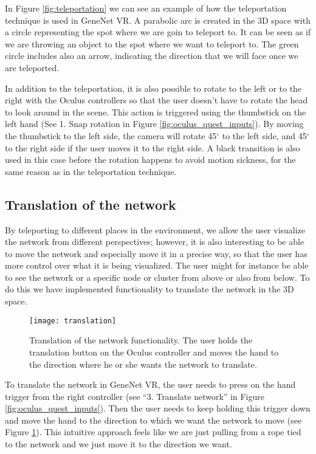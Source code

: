 In Figure \ref{fig:teleportation} we can see an example of how the teleportation technique is used in GeneNet VR. A  parabolic arc is created in the 3D space with a circle representing the spot where we are goin to teleport to. It can be seen as if we are throwing an object to the spot where we want to teleport to. The green circle includes also an arrow, indicating the direction that we will face once we are teleported.

In addition to the teleportation, it is also possible to rotate to the left or to the right with the Oculus controllers so that the user doesn't have to rotate the head to look around in the scene. This action is triggered using the thumbstick on the left hand (See 1. Snap rotation in Figure \ref{fig:oculus_quest_inputs}). By moving the thumbstick to the left side, the camera will rotate 45$^{\circ}$ to the left side, and 45$^{\circ}$ to the right side if the user moves it to the right side. A black transition is also used in this case before the rotation happens to avoid motion sickness, for the same reason as in the teleportation technique.

\subsection{Translation of the network}
By teleporting to different places in the environment, we allow the user visualize the network from different perspectives; however, it is also interesting to be able to move the network and especially move it in a precise way, so that the user has more control over what it is being visualized. The user might for instance be able to see the network or a specific node or cluster from above or also from below. To do this we have implemented functionality to translate the network in the 3D space.

\begin{figure}[h!]
    \centering%
    \texttt{[image: translation]}
    \caption{Translation of the network functionality. The user holds the translation button on the Oculus controller and moves the hand to the direction where he or she wants the network to translate.}
    \label{fig:translation}
\end{figure}%

To translate the network in GeneNet VR, the user needs to press on the hand trigger from the right controller (see “3. Translate network” in Figure \ref{fig:oculus_quest_inputs}). Then the user needs to keep holding this trigger down and move the hand to the direction to which we want the network to move (see Figure \ref{fig:translation}). This intuitive approach feels like we are just pulling from a rope tied to the network and we just move it to the direction we want.


